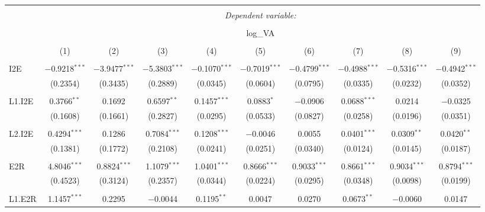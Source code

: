 
\begin{table}[!htbp] \centering 
  \caption{} 
  \label{} 
\begin{tabular}{@{\extracolsep{5pt}}lccccccccc} 
\\[-1.8ex]\hline 
\hline \\[-1.8ex] 
 & \multicolumn{9}{c}{\textit{Dependent variable:}} \\ 
\cline{2-10} 
\\[-1.8ex] & \multicolumn{9}{c}{log\_VA} \\ 
\\[-1.8ex] & (1) & (2) & (3) & (4) & (5) & (6) & (7) & (8) & (9)\\ 
\hline \\[-1.8ex] 
 I2E & $-$0.9218$^{***}$ & $-$3.9477$^{***}$ & $-$5.3803$^{***}$ & $-$0.1070$^{***}$ & $-$0.7019$^{***}$ & $-$0.4799$^{***}$ & $-$0.4988$^{***}$ & $-$0.5316$^{***}$ & $-$0.4942$^{***}$ \\ 
  & (0.2354) & (0.3435) & (0.2889) & (0.0345) & (0.0604) & (0.0795) & (0.0335) & (0.0232) & (0.0352) \\ 
  & & & & & & & & & \\ 
 L1.I2E & 0.3766$^{**}$ & 0.1692 & 0.6597$^{**}$ & 0.1457$^{***}$ & 0.0883$^{*}$ & $-$0.0906 & 0.0688$^{***}$ & 0.0214 & $-$0.0325 \\ 
  & (0.1608) & (0.1661) & (0.2827) & (0.0295) & (0.0533) & (0.0827) & (0.0258) & (0.0196) & (0.0351) \\ 
  & & & & & & & & & \\ 
 L2.I2E & 0.4294$^{***}$ & 0.1286 & 0.7084$^{***}$ & 0.1208$^{***}$ & $-$0.0046 & 0.0055 & 0.0401$^{***}$ & 0.0309$^{**}$ & 0.0420$^{**}$ \\ 
  & (0.1381) & (0.1772) & (0.2108) & (0.0241) & (0.0251) & (0.0340) & (0.0124) & (0.0145) & (0.0187) \\ 
  & & & & & & & & & \\ 
 E2R & 4.8046$^{***}$ & 0.8824$^{***}$ & 1.1079$^{***}$ & 1.0401$^{***}$ & 0.8666$^{***}$ & 0.9033$^{***}$ & 0.8661$^{***}$ & 0.9034$^{***}$ & 0.8794$^{***}$ \\ 
  & (0.4523) & (0.3124) & (0.2357) & (0.0344) & (0.0224) & (0.0295) & (0.0348) & (0.0098) & (0.0199) \\ 
  & & & & & & & & & \\ 
 L1.E2R & 1.1457$^{***}$ & 0.2295 & $-$0.0044 & 0.1195$^{**}$ & 0.0047 & 0.0270 & 0.0673$^{**}$ & $-$0.0060 & 0.0147 \\ 

\end{tabular}
\end{table}
